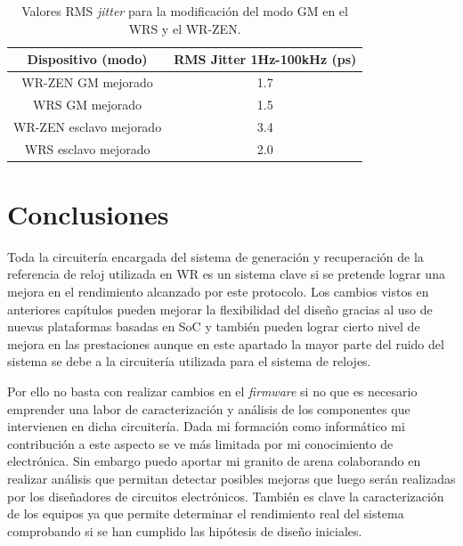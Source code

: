 \begin{table}
	\renewcommand{\arraystretch}{1.3}
	\caption{Valores RMS \textit{jitter} para la modificación del modo GM en el 
		WRS y el WR-ZEN.}
	\label{tab:gmmattia}
	\centering
	\begin{tabular}{|c||c|}
		\hline
		Dispositivo (modo) & RMS Jitter 1Hz-100kHz (ps) \\
		\hline
		WR-ZEN GM mejorado & 1.7 \\
		\hline
		WRS GM mejorado  & 1.5 \\
		\hline
		WR-ZEN esclavo mejorado & 3.4 \\
		\hline
		WRS esclavo mejorado & 2.0 \\
		\hline
	\end{tabular}
\end{table}

\section{Conclusiones}

Toda la circuitería encargada del sistema de generación y recuperación de la 
referencia de reloj utilizada en WR es un sistema clave si se pretende lograr 
una mejora en el rendimiento alcanzado por este protocolo. Los cambios vistos 
en anteriores capítulos pueden mejorar la flexibilidad del diseño gracias al 
uso de nuevas plataformas basadas en SoC y también pueden lograr cierto nivel 
de mejora en las prestaciones aunque en este apartado la mayor parte del ruido 
del sistema se debe a la circuitería utilizada para el sistema de relojes.

Por ello no basta con realizar cambios en el \textit{firmware} si no que es 
necesario emprender una labor de caracterización y análisis de los componentes 
que intervienen en dicha circuitería. Dada mi formación como informático mi 
contribución a este aspecto se ve más limitada por mi conocimiento de 
electrónica. Sin embargo puedo aportar mi granito de arena colaborando en 
realizar análisis que permitan detectar posibles mejoras que luego serán 
realizadas por los diseñadores de circuitos electrónicos. También es clave la 
caracterización de los equipos ya que permite determinar el rendimiento real 
del sistema comprobando si se han cumplido las hipótesis de diseño iniciales.

